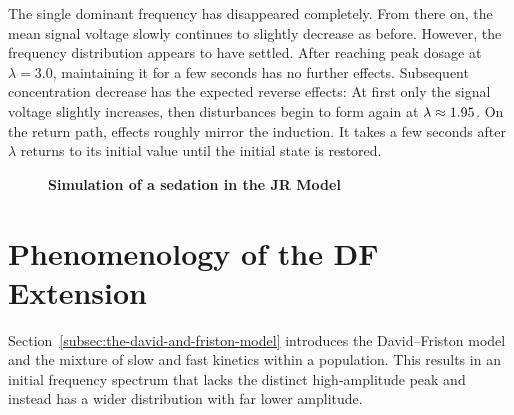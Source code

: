     The single dominant frequency has disappeared completely.
    From there on, the mean signal voltage slowly continues to slightly decrease as before.
    However, the frequency distribution appears to have settled.
    After reaching peak dosage at $\lambda = 3.0$, maintaining it for a few seconds has no further effects.
    Subsequent concentration decrease has the expected reverse effects:
    At first only the signal voltage slightly increases,
    then disturbances begin to form again at $\lambda \approx \rocStart$.
    On the return path, effects roughly mirror the induction.
    It takes a few seconds after $\lambda$ returns to its initial value until the initial state is restored.

\begin{figure}[H]

\caption{\textbf{Simulation of a sedation in the JR Model}
}\label{fig:sedation_sim_jr}
\end{figure}

\toggletrue{drawLocRoc}
\def\simRunName{DF_SEDATION_150}
\def\simRunTime{151}
\def\locStart{1.85}
\def\locST{33.5} %
\def\locEnd{2.05}
\def\locET{39.75}%
\def\rocStart{1.95}
\def\rocST{114.72}%
\def\rocEnd{1.5}
\def\rocET{128.81}%
\section{Phenomenology of the DF Extension}\label{subsec:phenomenology-of-the-df-extension}
Section~\ref{subsec:the-david-and-friston-model} introduces the David--Friston model and
    the mixture of slow and fast kinetics within a population.
    This results in an initial frequency spectrum
    that lacks the distinct high-amplitude peak and instead has a wider distribution with far lower amplitude.

